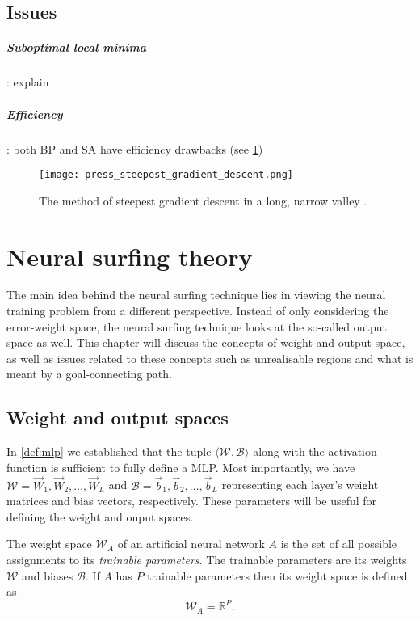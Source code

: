\section{Issues}
\label{sec:neural_training_issues}
\paragraph{Suboptimal local minima}
\todo: explain
\paragraph{Efficiency}
\todo: both BP and SA have efficiency drawbacks (see \ref{fig:gradient_descent_narrow_valley})
\begin{figure}
    \texttt{[image: press\_steepest\_gradient\_descent.png]}
    \caption{The method of steepest gradient descent in a long, narrow valley \cite[p. 421]{press1992}.}
    \label{fig:gradient_descent_narrow_valley}
\end{figure}

\chapter{Neural surfing theory}
The main idea behind the neural surfing technique lies in viewing the neural training problem from a different perspective. 
Instead of only considering the error-weight space, the neural surfing technique looks at the so-called output space as well. 
This chapter will discuss the concepts of weight and output space, as well as issues related to these concepts such as unrealisable regions and what is meant by a goal-connecting path.

\section{Weight and output spaces}
In \ref{def:mlp} we established that the tuple $\langle \mathscr{W}, \mathscr{B} \rangle$ along with the activation function is sufficient to fully define a MLP. 
Most importantly, we have $\mathscr{W} = \vec{W}_1, \vec{W}_2, \dots, \vec{W}_L$ and $\mathscr{B} = \vec{b}_1, \vec{b}_2, \dots, \vec{b}_L$ representing each layer's weight matrices and bias vectors, respectively. 
These parameters will be useful for defining the weight and ouput spaces.

\begin{definition}
    \label{def:weight_space}
    The weight space $\mathcal{W}_A$ of an artificial neural network $A$ is the set of all possible assignments to its \textit{trainable parameters}. 
    The trainable parameters are its weights $\mathscr{W}$ and biases $\mathscr{B}$.
    If $A$ has $P$ trainable parameters then its weight space is defined as
    \begin{equation}
        \mathcal{W}_A = \mathbb{R}^P.
    \end{equation}
\end{definition}

